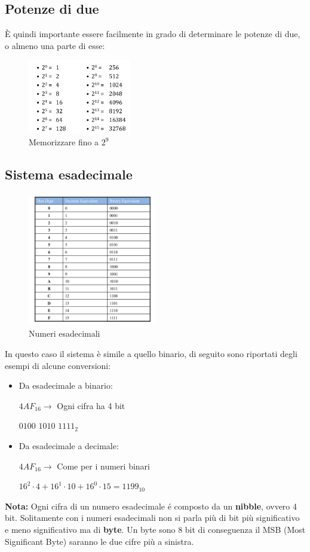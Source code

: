 \documentclass[../main.tex]{subfiles}
\begin{document}
\subsection{Potenze di due}
È quindi importante essere facilmente in grado di determinare le potenze di due, o almeno una parte di esse:
\begin{figure}[h]
    \centering
    \includegraphics[width=0.4\textwidth]{images/potenzeDiDue.jpeg}
    \caption{Memorizzare fino a $2^9$}
\end{figure}

\pagebreak
\subsection{Sistema esadecimale}
\begin{figure}[h]
    \centering
    \includegraphics[width=0.5\textwidth]{images/sistemaEsadecimale.jpeg}
    \caption{Numeri esadecimali}
\end{figure}

In questo caso il sistema è simile a quello binario, di seguito sono riportati degli esempi di alcune conversioni:
\begin{itemize}
    \item Da esadecimale a binario: 
        \begin{center}
            $4AF_{16} \rightarrow$ Ogni cifra ha 4 bit

            $0100$ $1010$ $1111_2$
        \end{center}
    \item Da esadecimale a decimale:
    \begin{center}
            $4AF_{16} \rightarrow$ Come per i numeri binari

            $16^2\cdot4+16^1\cdot10+16^0\cdot15=1199_{10}$
        \end{center}
\end{itemize}
\textbf{Nota:} Ogni cifra di un numero esadecimale é composto da un \textbf{nibble}, ovvero 4 bit.
Solitamente con i numeri esadecimali non si parla più di bit più significativo e meno significativo ma di \textbf{byte}.
Un byte sono 8 bit di conseguenza il MSB (Most Significant Byte) saranno le due cifre più a sinistra.
\end{document}
